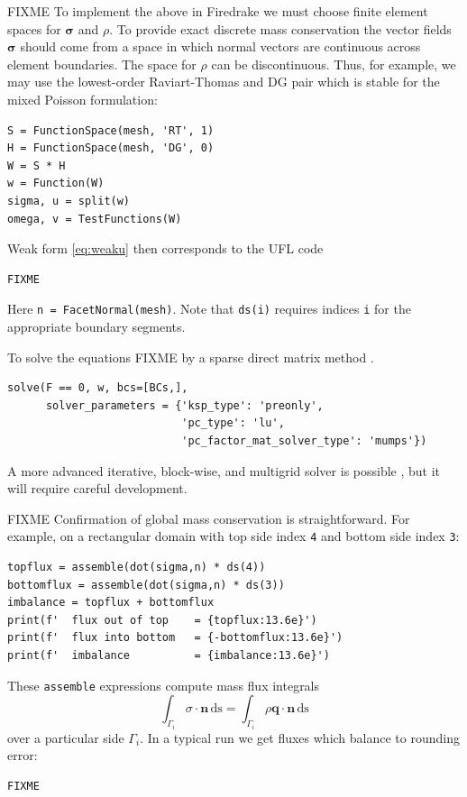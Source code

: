 \documentclass[11pt]{amsart}
\newcommand{\bn}{\mathbf{n}}
\newcommand{\bq}{\mathbf{q}}
\newcommand{\bsigma}{\bm{\sigma}}
\newcommand{\ds}{\mathrm{ds}}
\begin{document}
FIXME To implement the above in Firedrake we must choose finite element spaces for $\bsigma$ and $\rho$.  To provide exact discrete mass conservation the vector fields $\bsigma$ should come from a space in which normal vectors are continuous across element boundaries.  The space for $\rho$ can be discontinuous.  Thus, for example, we may use the lowest-order Raviart-Thomas and DG pair which is stable for the mixed Poisson formulation:
\begin{Verbatim}[fontsize=\small,frame=lines]
S = FunctionSpace(mesh, 'RT', 1)
H = FunctionSpace(mesh, 'DG', 0)
W = S * H
w = Function(W)
sigma, u = split(w)
omega, v = TestFunctions(W)
\end{Verbatim}
Weak form \eqref{eq:weaku} then corresponds to the UFL code
\begin{Verbatim}[fontsize=\small,frame=lines]
FIXME
\end{Verbatim}
Here \verb|n = FacetNormal(mesh)|.  Note that \verb|ds(i)| requires indices \verb|i| for the appropriate boundary segments.

To solve the equations FIXME by a sparse direct matrix method \citep{Amestoy2001}.
\begin{Verbatim}[fontsize=\small,frame=lines]
solve(F == 0, w, bcs=[BCs,],
      solver_parameters = {'ksp_type': 'preonly',
                           'pc_type': 'lu',
                           'pc_factor_mat_solver_type': 'mumps'})
\end{Verbatim}
A more advanced iterative, block-wise, and multigrid solver is possible \citep[e.g.][]{Bueler2021}, but it will require careful development.

FIXME Confirmation of global mass conservation is straightforward.  For example, on a rectangular domain with top side index \verb|4| and bottom side index \verb|3|:
\begin{Verbatim}[fontsize=\small,frame=lines]
topflux = assemble(dot(sigma,n) * ds(4))
bottomflux = assemble(dot(sigma,n) * ds(3))
imbalance = topflux + bottomflux
print(f'  flux out of top    = {topflux:13.6e}')
print(f'  flux into bottom   = {-bottomflux:13.6e}')
print(f'  imbalance          = {imbalance:13.6e}')
\end{Verbatim}
These \verb|assemble| expressions compute mass flux integrals
    $$\int_{\Gamma_i} \sigma\cdot \bn\,\ds = \int_{\Gamma_i} \rho \bq\cdot \bn\,\ds$$
over a particular side $\Gamma_i$.  In a typical run we get fluxes which balance to rounding error:
\begin{Verbatim}[fontsize=\small,frame=leftline]
FIXME
\end{Verbatim}
\end{document}
